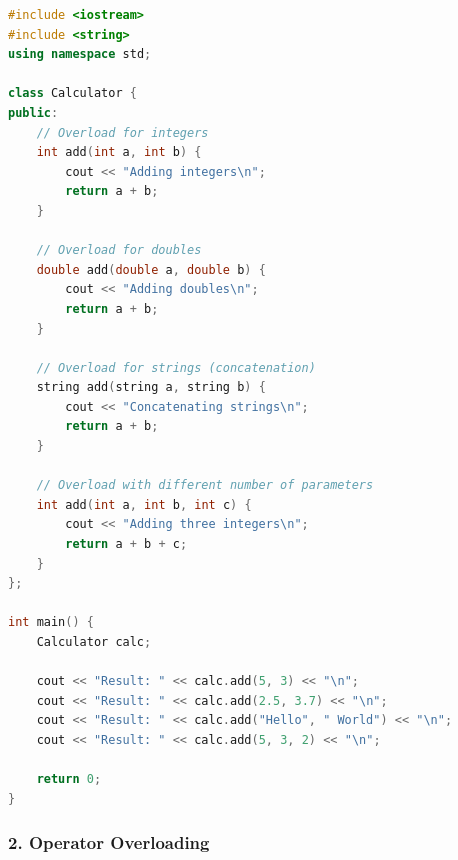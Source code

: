 \begin{lstlisting}[language={C++}]
#include <iostream>
#include <string>
using namespace std;

class Calculator {
public:
    // Overload for integers
    int add(int a, int b) {
        cout << "Adding integers\n";
        return a + b;
    }
    
    // Overload for doubles
    double add(double a, double b) {
        cout << "Adding doubles\n";
        return a + b;
    }
    
    // Overload for strings (concatenation)
    string add(string a, string b) {
        cout << "Concatenating strings\n";
        return a + b;
    }
    
    // Overload with different number of parameters
    int add(int a, int b, int c) {
        cout << "Adding three integers\n";
        return a + b + c;
    }
};

int main() {
    Calculator calc;
    
    cout << "Result: " << calc.add(5, 3) << "\n";
    cout << "Result: " << calc.add(2.5, 3.7) << "\n";
    cout << "Result: " << calc.add("Hello", " World") << "\n";
    cout << "Result: " << calc.add(5, 3, 2) << "\n";
    
    return 0;
}
\end{lstlisting}

\hypertarget{operator-overloading}{%
\subsubsection{2. Operator Overloading}\label{operator-overloading}}

